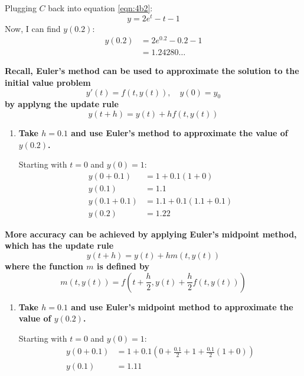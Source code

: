 \documentclass[11pt]{article}
\begin{document}
\begin{enumerate}[label={\textbf{\arabic*.}}]
{\begin{enumerate}[label={\textbf{(\alph*)}}]
{                    Plugging $C$ back into equation \ref{eqn:4b2}:
                    $$y=2e^t-t-1$$
                    Now, I can find $y(0.2)$:
                    \begin{align*}
                        y(0.2)&=2e^{0.2}-0.2-1 \\
                        &=1.24280\ldots
                    \end{align*}
                }
            \end{enumerate}
            \textbf{\boldmath Recall, Euler's method can be used to approximate the solution to the initial value problem $$y'(t)=f(t,y(t)),\quad y(0)=y_0$$ by applyng the update rule $$y(t+h)=y(t)+hf(t,y(t))$$}
            \begin{enumerate}[label={\textbf{(\alph*)}}, resume]
                \item{
                    \textbf{\boldmath Take $h=0.1$ and use Euler's method to approximate the value of $y(0.2)$.}
                    \par
                    Starting with $t=0$ and $y(0)=1$:
                    \begin{align*}
                        y(0+0.1)&=1+0.1(1+0) \\
                        y(0.1)&=1.1 \\[8pt]
                        y(0.1+0.1)&=1.1+0.1(1.1+0.1) \\
                        y(0.2)&=1.22
                    \end{align*}
                }
            \end{enumerate}
            \textbf{\boldmath More accuracy can be achieved by applying Euler's midpoint method, which has the update rule $$y(t+h)=y(t)+hm(t,y(t))$$ where the function $m$ is defined by $$m(t,y(t))=f\left(t+\frac{h}{2},y(t)+\frac{h}{2}f(t,y(t))\right)$$}
            \begin{enumerate}[label={\textbf{(\alph*)}}, resume]
                \item{
                    \textbf{\boldmath Take $h=0.1$ and use Euler's midpoint method to approximate the value of $y(0.2)$.}
                    \par
                    Starting with $t=0$ and $y(0)=1$:
                    \begin{align*}
                        y(0+0.1)&=1+0.1\left(0+\frac{0.1}{2}+1+\frac{0.1}{2}(1+0)\right) \\
                        y(0.1)&=1.11 \\[8pt]

\end{align*}}
\end{enumerate}}
\end{enumerate}
\end{document}
